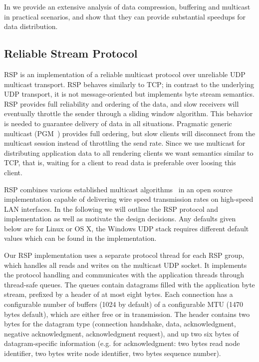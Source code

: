 In \cite{ESP:18} we provide an extensive analysis of data compression, buffering
and multicast in practical scenarios, and show that they can provide substantial
speedups for data distribution.

\subsection{Reliable Stream Protocol}\label{sec:RSP}

RSP is an implementation of a reliable multicast protocol over unreliable UDP
multicast transport. RSP behaves similarly to TCP; in contrast to the underlying
UDP transport, it is not message-oriented but implements byte stream semantics.
RSP provides full reliability and ordering of the data, and slow receivers will
eventually throttle the sender through a sliding window algorithm. This behavior
is needed to guarantee delivery of data in all situations. Pragmatic generic
multicast (PGM~\cite{pgm}) provides full ordering, but slow clients will
disconnect from the multicast session instead of throttling the send rate. Since
we use multicast for distributing application data to all rendering clients we
want semantics similar to TCP, that is, waiting for a client to read data is
preferable over loosing this client.

RSP combines various established multicast
algorithms~\cite{adamson2004negative,Gau:2002} in an open source implementation
capable of delivering wire speed transmission rates on high-speed LAN
interfaces. In the following we will outline the RSP protocol and implementation
as well as motivate the design decisions. Any defaults given below are for Linux
or OS X, the Windows UDP stack requires different default values which can be
found in the implementation.

Our RSP implementation uses a separate protocol thread for each RSP group, which
handles all reads and writes on the multicast UDP socket. It implements the
protocol handling and communicates with the application threads through
thread-safe queues. The queues contain datagrams filled with the application
byte stream, prefixed by a header of at most eight bytes. Each connection has a
configurable number of buffers (1024 by default) of a configurable MTU (1470
bytes default), which are either free or in transmission. The header contains
two bytes for the datagram type (connection handshake, data, acknowledgment,
negative acknowledgment, acknowledgment request), and up two six bytes of
datagram-specific information (e.g. for acknowledgment: two bytes read node
identifier, two bytes write node identifier, two bytes sequence number).

